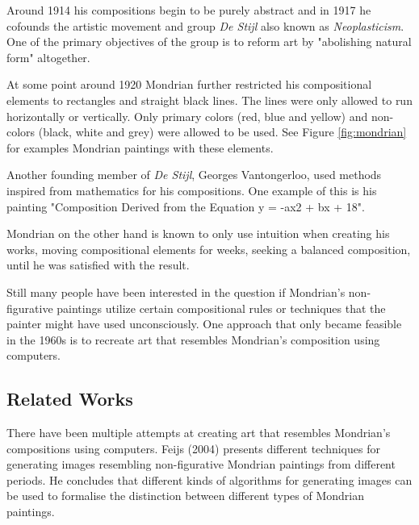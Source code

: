 \documentclass[serif,article,noparskip]{agse-thesis}
\begin{document}
Around 1914 his compositions begin to be purely abstract and in 1917 he cofounds
the artistic movement and group \textit{De Stijl} also known as
\textit{Neoplasticism}. One of the primary objectives of the group is to reform
art by "abolishing natural form" \cite{wiki:manifest} altogether.

At some point around 1920 Mondrian further restricted his compositional elements
to rectangles and straight black lines. The lines were only allowed to run
horizontally or vertically. Only primary colors (red, blue and yellow) and
non-colors (black, white and grey) were allowed to be used. See Figure
\ref{fig:mondrian} for examples Mondrian paintings with these elements.

Another founding member of \textit{De Stijl}, Georges Vantongerloo, used methods
inspired from mathematics for his compositions. One example of this is his
painting "Composition Derived from the Equation y = -ax2 + bx + 18".

Mondrian on the other hand is known to only use intuition when creating his
works, moving compositional elements for weeks, seeking a balanced composition,
until he was satisfied with the result.


Still many people have been interested in the question if Mondrian's
non-figurative paintings utilize certain compositional rules or techniques that
the painter might have used unconsciously. One approach that only became
feasible in the 1960s is to recreate art that resembles Mondrian's composition
using computers.

\subsection{Related Works}

There have been multiple attempts at creating art that resembles Mondrian's
compositions using computers. Feijs (2004)\cite{Feijs2004} presents different
techniques for generating images resembling non-figurative Mondrian paintings
from different periods. He concludes that different kinds of algorithms for
generating images can be used to formalise the distinction between different
types of Mondrian paintings.
\end{document}
